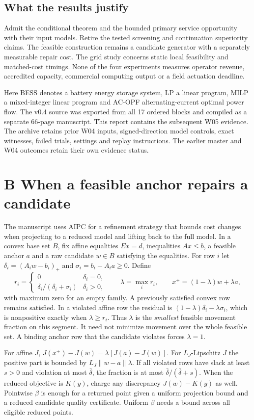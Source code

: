 \documentclass[10pt,letterpaper]{article}
\newcommand{\sect}[1]{\section*{\color{ink}#1}}
\newcommand{\sub}[1]{\subsection*{\color{green}#1}}
\begin{document}
\sub{What the results justify}
Admit the conditional theorem and the bounded primary service opportunity with their input models. Retire the tested screening and continuation superiority claims. The feasible construction remains a candidate generator with a separately measurable repair cost. The grid study concerns static local feasibility and matched-cost timings. None of the four experiments measures operator revenue, accredited capacity, commercial computing output or a field actuation deadline.

Here BESS denotes a battery energy storage system, LP a linear program, MILP a mixed-integer linear program and AC-OPF alternating-current optimal power flow. The v0.4 source was exported from all 17 ordered blocks and compiled as a separate 66-page manuscript. This report contains the subsequent W05 evidence. The archive retains prior W04 inputs, signed-direction model controls, exact witnesses, failed trials, settings and replay instructions. The earlier master and W04 outcomes retain their own evidence status.
\clearpage
\sect{B \quad When a feasible anchor repairs a candidate}
The manuscript uses AIPC for a refinement strategy that bounds cost changes when projecting to a reduced model and lifting back to the full model. In a convex base set $B$, fix affine equalities $Ex=d$, inequalities $Ax\le b$, a feasible anchor $a$ and a raw candidate $w\in B$ satisfying the equalities. For row $i$ let $\delta_i=(A_iw-b_i)_+$ and $\sigma_i=b_i-A_ia\ge0$. Define
\[
 r_i=\begin{cases}0&\delta_i=0,\\ \delta_i/(\delta_i+\sigma_i)&\delta_i>0,\end{cases}
 \qquad \lambda=\max_i r_i,\qquad x^+=(1-\lambda)w+\lambda a ,
\]
with maximum zero for an empty family. A previously satisfied convex row remains satisfied. In a violated affine row the residual is $(1-\lambda)\delta_i-\lambda\sigma_i$, which is nonpositive exactly when $\lambda\ge r_i$. Thus $\lambda$ is the \emph{smallest} feasible movement fraction on this segment. It need not minimize movement over the whole feasible set. A binding anchor row that the candidate violates forces $\lambda=1$.

For affine $J$, $J(x^+)-J(w)=\lambda[J(a)-J(w)]$. For $L_J$-Lipschitz $J$ the positive part is bounded by $L_J\|w-a\|\lambda$. If all violated rows have slack at least $s>0$ and violation at most $\bar\delta$, the fraction is at most $\bar\delta/(\bar\delta+s)$. When the reduced objective is $K(y)$, charge any discrepancy $J(w)-K(y)$ as well. Pointwise $\beta$ is enough for a returned point given a uniform projection bound and a reduced candidate quality certificate. Uniform $\beta$ needs a bound across all eligible reduced points.
\end{document}
